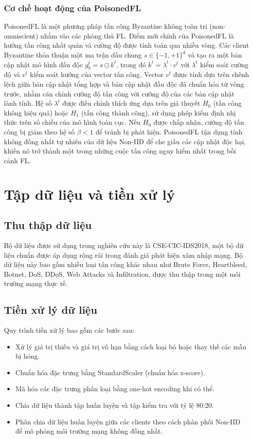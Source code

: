 \subsubsection{Cơ chế hoạt động của PoisonedFL}
PoisonedFL là một phương pháp tấn công Byzantine không toàn tri (non-omniscient) nhắm vào các phòng thủ FL. Điểm mới chính của PoisonedFL là hướng tấn công nhất quán và cường độ được tính toán qua nhiều vòng. Các client Byzantine thỏa thuận một ma trận dấu chung $s \in \{-1, +1\}^d$ và tạo ra một bản cập nhật mô hình đầu độc $g^t_b = s \odot k^t$, trong đó $k^t = \lambda^t \cdot v^t$ với $\lambda^t$ kiểm soát cường độ và $v^t$ kiểm soát hướng của vector tấn công. Vector $v^t$ được tính dựa trên chênh lệch giữa bản cập nhật tổng hợp và bản cập nhật đầu độc đã chuẩn hóa từ vòng trước, nhằm căn chỉnh cường độ tấn công với cường độ của các bản cập nhật lành tính. Hệ số $\lambda^t$ được điều chỉnh thích ứng dựa trên giả thuyết $H_0$ (tấn công không hiệu quả) hoặc $H_1$ (tấn công thành công), sử dụng phép kiểm định nhị thức trên số chiều của mô hình toàn cục. Nếu $H_0$ được chấp nhận, cường độ tấn công bị giảm theo hệ số $\beta < 1$ để tránh bị phát hiện. PoisonedFL tận dụng tính không đồng nhất tự nhiên của dữ liệu Non-IID để che giấu các cập nhật độc hại, khiến nó trở thành một trong những cuộc tấn công nguy hiểm nhất trong bối cảnh FL.

\section{Tập dữ liệu và tiền xử lý}
\label{sec:dataset}

\subsection{Thu thập dữ liệu}
Bộ dữ liệu được sử dụng trong nghiên cứu này là CSE-CIC-IDS2018, một bộ dữ liệu chuẩn được áp dụng rộng rãi trong đánh giá phát hiện xâm nhập mạng. Bộ dữ liệu này bao gồm nhiều loại tấn công khác nhau như Brute Force, Heartbleed, Botnet, DoS, DDoS, Web Attacks và Infiltration, được thu thập trong một môi trường mạng thực tế.

\subsection{Tiền xử lý dữ liệu}
Quy trình tiền xử lý bao gồm các bước sau:
\begin{itemize}
    \item Xử lý giá trị thiếu và giá trị vô hạn bằng cách loại bỏ hoặc thay thế các mẫu bị hỏng.
    \item Chuẩn hóa đặc trưng bằng StandardScaler (chuẩn hóa z-score).
    \item Mã hóa các đặc trưng phân loại bằng one-hot encoding khi có thể.
    \item Chia dữ liệu thành tập huấn luyện và tập kiểm tra với tỷ lệ 80:20.
    \item Phân chia dữ liệu huấn luyện giữa các clients theo cách phân phối Non-IID để mô phỏng môi trường mạng không đồng nhất.
\end{itemize}

